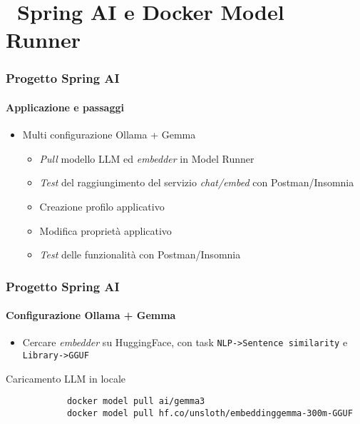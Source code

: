 \section{\faWrench\ Spring AI e Docker Model Runner} %
\label{sec:spring-ai-docker-model-runner}
%
\begin{frame}[t,fragile] \frametitle{Progetto Spring AI}
    \framesubtitle{Applicazione e passaggi}
    {\small
    \begin{itemize}[leftmargin=10pt,align=right]
        \item[\alert{\faArrowCircleRight}] Multi configurazione Ollama + Gemma
        \begin{itemize}[leftmargin=10pt,align=right]
            \item[\alertedcircled{1}] \textit{Pull} modello LLM ed \textit{embedder} in Model Runner
            \item[\alertedcircled{2}] \textit{Test} del raggiungimento del servizio \textit{chat/embed} con Postman/Insomnia
            \item[\alertedcircled{3}] Creazione profilo applicativo     
            \item[\alertedcircled{4}] Modifica proprietà applicativo
            \item[\alertedcircled{5}] \textit{Test} delle funzionalità con Postman/Insomnia
        \end{itemize}
    \end{itemize}
    }
\end{frame}
%
\begin{frame}[t,fragile] \frametitle{Progetto Spring AI}
    \framesubtitle{Configurazione Ollama + Gemma}
        \begin{itemize}[leftmargin=10pt,align=right]
            \item[\alert{\faExclamationTriangle}] Cercare \textit{embedder} su HuggingFace, con task \texttt{NLP->Sentence similarity} e \texttt{Library->GGUF}
        \end{itemize}
        \begin{codeblock}{Caricamento LLM in locale}
            \begin{verbatim}
            docker model pull ai/gemma3
            docker model pull hf.co/unsloth/embeddinggemma-300m-GGUF
            \end{verbatim}
        \end{codeblock}
\end{frame}
%
